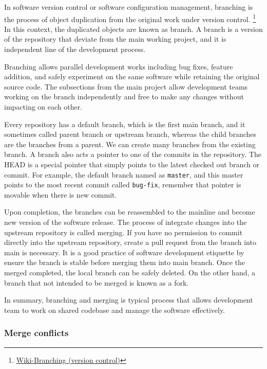 \documentclass[
  letterpaper,
  DIV=11,
  numbers=noendperiod]{scrreport}
\begin{document}
In software version control or software configuration management,
branching is the process of object duplication from the original work
under version control. \footnote{\href{https://en.wikipedia.org/wiki/Branching_(version_control)}{Wiki-Branching
  (version control)}} In this context, the duplicated objects are known
as branch. A branch is a version of the repository that deviate from the
main working project, and it is independent line of the development
process.

Branching allows parallel development works including bug fixes, feature
addition, and safely experiment on the same software while retaining the
original source code. The subsections from the main project allow
development teams working on the branch independently and free to make
any changes without impacting on each other.

Every repository has a default branch, which is the first main branch,
and it sometimes called parent branch or upstream branch, whereas the
child branches are the branches from a parent. We can create many
branches from the existing branch. A branch also acts a pointer to one
of the commits in the repository. The HEAD is a special pointer that
simply points to the latest checked out branch or commit. For example,
the default branch named as \texttt{master}, and this master points to
the most recent commit called \texttt{bug-fix}, remember that pointer is
movable when there is new commit.

Upon completion, the branches can be reassembled to the mainline and
become new version of the software release. The process of integrate
changes into the upstream repository is called merging. If you have no
permission to commit directly into the upstream repository, create a
pull request from the branch into main is necessary. It is a good
practice of software development etiquette by ensure the branch is
stable before merging them into main branch. Once the merged completed,
the local branch can be safely deleted. On the other hand, a branch that
not intended to be merged is known as a fork.

In summary, branching and merging is typical process that allows
development team to work on shared codebase and manage the software
effectively.

\hypertarget{merge-conflicts}{%
\subsubsection{Merge conflicts}\label{merge-conflicts}}
\end{document}
